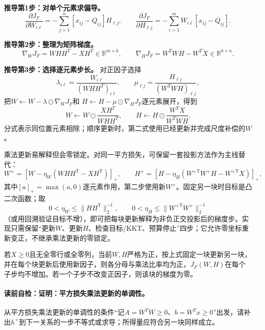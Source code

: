 \textbf{推导第1步：对单个元素求偏导。}
\[
\frac{\partial J_F}{\partial W_{i\ell}}
=-\sum_{j=1}^n[x_{ij}-Q_{ij}]H_{\ell j},
\qquad
\frac{\partial J_F}{\partial H_{\ell j}}
=-\sum_{i=1}^mW_{i\ell}[x_{ij}-Q_{ij}].
\]

\textbf{推导第2步：整理为矩阵梯度。}
\[
\nabla_WJ_F=WHH^T-XH^T\in\mathbb R^{m\times k},
\qquad
\nabla_HJ_F=W^TWH-W^TX\in\mathbb R^{k\times n}.
\]

\textbf{推导第3步：选择逐元素步长。}
对正因子选择
\[
\lambda_{i\ell}=\frac{W_{i\ell}}{(WHH^T)_{i\ell}},
\qquad
\mu_{\ell j}=\frac{H_{\ell j}}{(W^TWH)_{\ell j}},
\]
把$W\leftarrow W-\lambda\odot\nabla_WJ_F$和
$H\leftarrow H-\mu\odot\nabla_HJ_F$逐元素展开，得到
\[
W\leftarrow W\odot\frac{XH^T}{WHH^T},
\qquad
H\leftarrow H\odot\frac{W^TX}{W^TWH}.
\]
分式表示同位置元素相除；顺序更新时，第二式使用已经更新并完成尺度补偿的$W$。

\begin{keypointbox}[title=核心替代：交替投影梯度]
乘法更新易解释但会零锁定。对同一平方损失，可保留一套投影方法作为主线替代：
\[
W^+=\left[W-\eta_W(WHH^{\mathsf T}-XH^{\mathsf T})\right]_+,
\qquad
H^+=\left[H-\eta_H(W^{+\mathsf T}W^+H-W^{+\mathsf T}X)\right]_+,
\]
其中$[a]_+=\max(a,0)$逐元素作用，第二步使用新$W^+$。固定另一块时目标是凸二次函数；取
\[
0<\eta_W\le\|HH^{\mathsf T}\|_2^{-1},
\qquad
0<\eta_H\le\|W^{+\mathsf T}W^+\|_2^{-1}
\]
（或用回溯验证目标不增），即可把每块更新解释为非负正交投影后的梯度步。实现只需保留“更新$W$、更新$H$、检查目标/KKT、预算停止”四步；它允许零坐标重新变正，不继承乘法更新的零锁定。
\end{keypointbox}

\begin{theorem}[平方损失乘法更新的单调性]\label{thm:V4-C05-fro-monotone}
若$X\ge0$且无全零行或全零列，当前$W,H$严格为正，按上式固定一块更新另一块，并在每个块更新后使用新因子，则各分母与乘法比率均为正，$J_F(W,H)$在每个子步均不增加。若一个子步不改变正因子，则该块的梯度为零。
\end{theorem}
\paragraph{读前自检：证明：平方损失乘法更新的单调性。}从平方损失乘法更新的单调性的条件“记$A=W^TW\ge0$、$b=W^Tx\ge0$”出发，请补出$h^+$到下一关系的一步不等式或求导；所得量应符合另一块同样成立。\par

